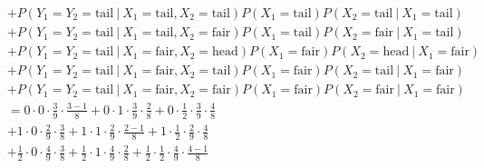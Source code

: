 \begin{solution}
\begin{enumerate}[label = (\alph*)]
\begin{align*}
        & +
        P(Y_1 = Y_2 = \mathrm{tail} ~|~ X_1 = \mathrm{tail}, X_2 = \mathrm{tail}) P(X_1 = \mathrm{tail}) P(X_2 = \mathrm{tail} ~|~ X_1 = \mathrm{tail}) \\
        & +
        P(Y_1 = Y_2 = \mathrm{tail} ~|~ X_1 = \mathrm{tail}, X_2 = \mathrm{fair}) P(X_1 = \mathrm{tail}) P(X_2 = \mathrm{fair} ~|~ X_1 = \mathrm{tail}) \\
        & +
        P(Y_1 = Y_2 = \mathrm{tail} ~|~ X_1 = \mathrm{fair}, X_2 = \mathrm{head}) P(X_1 = \mathrm{fair}) P(X_2 = \mathrm{head} ~|~ X_1 = \mathrm{fair}) \\
        & +
        P(Y_1 = Y_2 = \mathrm{tail} ~|~ X_1 = \mathrm{fair}, X_2 = \mathrm{tail}) P(X_1 = \mathrm{fair}) P(X_2 = \mathrm{tail} ~|~ X_1 = \mathrm{fair}) \\
        & +
        P(Y_1 = Y_2 = \mathrm{tail} ~|~ X_1 = \mathrm{fair}, X_2 = \mathrm{fair}) P(X_1 = \mathrm{fair}) P(X_2 = \mathrm{fair} ~|~ X_1 = \mathrm{fair}) \\
        & =
        0           \cdot 0           \cdot \frac{3}{9} \cdot \frac{3 - 1}{8}
        +
        0           \cdot 1           \cdot \frac{3}{9} \cdot \frac{2}{8}
        +
        0           \cdot \frac{1}{2} \cdot \frac{3}{9} \cdot \frac{4}{8} \\
        & +
        1           \cdot 0           \cdot \frac{2}{9} \cdot \frac{3}{8}
        +
        1           \cdot 1           \cdot \frac{2}{9} \cdot \frac{2 - 1}{8}
        +
        1           \cdot \frac{1}{2} \cdot \frac{2}{9} \cdot \frac{4}{8} \\
        & +
        \frac{1}{2} \cdot 0           \cdot \frac{4}{9} \cdot \frac{3}{8}
        +
        \frac{1}{2} \cdot 1           \cdot \frac{4}{9} \cdot \frac{2}{8}
        +
        \frac{1}{2} \cdot \frac{1}{2} \cdot \frac{4}{9} \cdot \frac{4 - 1}{8}
    \end{align*}

\end{enumerate}

\end{solution}

